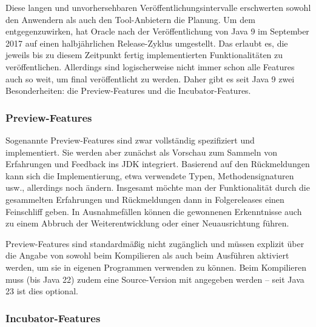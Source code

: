 Diese langen und unvorhersehbaren Veröffentlichungsintervalle erschwerten sowohl den Anwendern als auch den Tool-Anbietern die Planung. Um dem entgegenzuwirken, hat Oracle nach der Veröffentlichung von Java 9 im September 2017 auf einen halbjährlichen Release-Zyklus umgestellt. Das erlaubt es,  die jeweils bis zu diesem Zeitpunkt fertig implementierten Funktionalitäten zu veröffentlichen.
Allerdings sind logischerweise nicht immer schon alle Features auch so weit, um final
veröffentlicht zu werden. Daher gibt es seit Java 9 zwei Besonderheiten:
die  Preview-Features und  die Incubator-Features.




\subsubsection{Preview-Features}
\label{subsubsec:Preview-Features}


Sogenannte Preview-Features sind zwar vollständig spezifiziert und implementiert.
Sie werden aber zunächst als Vorschau zum Sammeln von Erfahrungen und Feedback ins
JDK integriert. Basierend auf den Rückmeldungen kann sich die Implementierung,
etwa verwendete Typen, Methodensignaturen usw., allerdings noch ändern.
Insgesamt möchte man der Funktionalität durch die gesammelten Erfahrungen und Rückmeldungen
dann in Folgereleases einen Feinschliff  geben. In Ausnahmefällen können die gewonnenen Erkenntnisse auch zu
 einem Abbruch der Weiterentwicklung oder einer Neuausrichtung führen.


Preview-Features  sind standardmäßig nicht zugänglich
und müssen explizit über die Angabe von \code{-}
sowohl beim Kompilieren als auch beim Ausführen  aktiviert werden, um
sie in eigenen Programmen verwenden zu können.
Beim Kompilieren  muss (bis Java 22) zudem eine Source-Version
 mit  \code{-} angegeben werden --
seit Java 23 ist dies optional.




\subsubsection{Incubator-Features}


